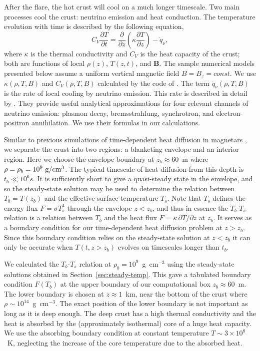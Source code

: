 After the flare, the hot crust will cool on a much longer timescale. 
Two main processes cool the crust: neutrino emission and heat conduction.
The temperature evolution with time is described by the following equation,
\begin{equation}
\label{eq:cool}
C_V \frac{\partial T}{\partial t} = 
  \frac{\partial}{\partial z}\left(\kappa
  \frac{\partial T}{\partial z}\right)-
  \dot{q}_\nu,
\end{equation}
where $\kappa$ is the thermal conductivity and $C_V$ is the heat capacity of the crust; both are functions of local $\rho(z)$, $T(z,t)$, and ${\mathbf B}$. 
The sample numerical models presented below assume a uniform vertical magnetic field $B=B_z=const$. 
We use $\kappa(\rho,T,B)$ and $C_V(\rho,T,B)$ calculated by the code of \citet{1999A&A...351..787P}. 
The term $\dot{q}_\nu(\rho,T,B)$ is the rate of local cooling by neutrino emission. This rate is described in detail by \citet{2001A&A...374..213P}. 
They provide useful analytical approximations for four relevant channels of neutrino emission: plasmon decay, bremsstrahlung, synchrotron, and electron-positron annihilation. 
We use their formulas in our calculations.

Similar to previous simulations of time-dependent heat diffusion in magnetars \citep{2006MNRAS.371..477K,2009ApJ...698.1020B,2009A&A...496..207P}, we separate the crust into two regions: a blanketing envelope and an interior region. 
Here we choose the envelope boundary at $z_b\approx 60$~m where $\rho=\rho_b=10^{9}\rm ~g/cm^3$.
The typical timescale of heat diffusion from this depth is $t_b \ll 10^6 s$.
It is sufficiently short to give a quasi-steady state in the envelope, and so the steady-state solution may be used to determine the relation between $T_b=T(z_b)$ and the effective surface temperature $T_s$.
Note that $T_s$ defines the energy flux $F=\sigma T_s^4$ through the envelope $z<z_b$, and thus in essence the $T_b$-$T_s$ relation is a relation between $T_b$ and the heat flux $F=\kappa\, \partial T/\partial z$ at $z_b$. 
It serves as a boundary condition for our time-dependent heat diffusion problem at $z>z_b$. 
Since this boundary condition relies on the steady-state solution at $z<z_b$ it can only be accurate when $T(t,z>z_b)$ evolves on timescales longer than $t_b$.

We calculated the $T_b$-$T_s$ relation at $\rho_b=10^9$~g~cm$^{-3}$ using the steady-state solutions obtained in Section~\ref{sec:steady-temp}. 
This gave a tabulated boundary condition $F(T_b)$ at the upper boundary of our computational box $z_b\approx 60$~m. 
The lower boundary is chosen at $z\approx 1$~km, near the bottom of the crust where $\rho\sim 10^{14}$~g~cm$^{-3}$. 
The exact position of the lower boundary is not important as long as it is deep enough. 
The deep crust has a high thermal conductivity and the heat is absorbed by the (approximately isothermal) core of a huge heat capacity. 
We use the absorbing boundary condition at constant temperature $T\sim 3\times 10^8$~K, neglecting the increase of the core temperature due to the absorbed heat.

